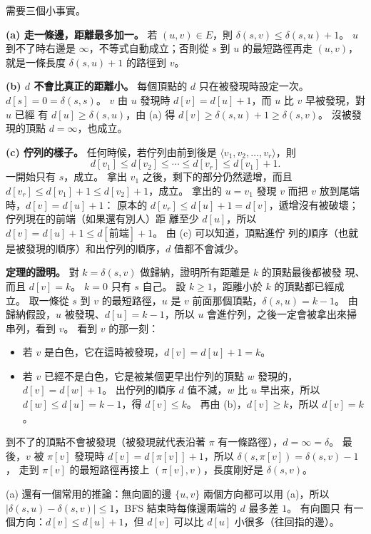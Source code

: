\begin{whybox}
需要三個小事實。

\textbf{(a) 走一條邊，距離最多加一。} 若 $(u, v) \in E$，則 $\delta(s, v) \le \delta(s, u)
+ 1$。 $u$ 到不了時右邊是 $\infty$，不等式自動成立；否則從 $s$ 到 $u$ 的最短路徑再走 $(u, v)$，
就是一條長度 $\delta(s, u) + 1$ 的路徑到 $v$。

\textbf{(b) $d$ 不會比真正的距離小。} 每個頂點的 $d$ 只在被發現時設定一次。 $d[s] = 0
= \delta(s, s)$。 $v$ 由 $u$ 發現時 $d[v] = d[u] + 1$，而 $u$ 比 $v$ 早被發現，對 $u$ 已經
有 $d[u] \ge \delta(s, u)$，由 (a) 得 $d[v] \ge \delta(s, u) + 1 \ge \delta(s, v)$。 沒被發
現的頂點 $d = \infty$，也成立。

\textbf{(c) 佇列的樣子。} 任何時候，若佇列由前到後是 $\langle v_1, v_2, \ldots, v_r
\rangle$，則
\[
d[v_1] \le d[v_2] \le \cdots \le d[v_r] \le d[v_1] + 1.
\]
一開始只有 $s$，成立。 拿出 $v_1$ 之後，剩下的部分仍然遞增，而且 $d[v_r] \le d[v_1] + 1
\le d[v_2] + 1$，成立。 拿出的 $u = v_1$ 發現 $v$ 而把 $v$ 放到尾端時，$d[v] = d[u] + 1$：
原本的 $d[v_r] \le d[u] + 1 = d[v]$，遞增沒有被破壞；佇列現在的前端（如果還有別人）距
離至少 $d[u]$，所以 $d[v] = d[u] + 1 \le d[\text{前端}] + 1$。 由 (c) 可以知道，頂點進佇
列的順序（也就是被發現的順序）和出佇列的順序，$d$ 值都不會減少。

\textbf{定理的證明。} 對 $k = \delta(s, v)$ 做歸納，證明所有距離是 $k$ 的頂點最後都被發
現、而且 $d[v] = k$。 $k = 0$ 只有 $s$ 自己。 設 $k \ge 1$，距離小於 $k$ 的頂點都已經成
立。 取一條從 $s$ 到 $v$ 的最短路徑，$u$ 是 $v$ 前面那個頂點，$\delta(s, u) = k - 1$。 由
歸納假設，$u$ 被發現、$d[u] = k - 1$，所以 $u$ 會進佇列，之後一定會被拿出來掃串列，看到
$v$。 看到 $v$ 的那一刻：
\begin{itemize}
\item 若 $v$ 是白色，它在這時被發現，$d[v] = d[u] + 1 = k$。
\item 若 $v$ 已經不是白色，它是被某個更早出佇列的頂點 $w$ 發現的，$d[v] = d[w] + 1$。
出佇列的順序 $d$ 值不減，$w$ 比 $u$ 早出來，所以 $d[w] \le d[u] = k - 1$，得 $d[v] \le k$。
再由 (b)，$d[v] \ge k$，所以 $d[v] = k$。
\end{itemize}
到不了的頂點不會被發現（被發現就代表沿著 $\pi$ 有一條路徑），$d = \infty = \delta$。 最
後，$v$ 被 $\pi[v]$ 發現時 $d[v] = d[\pi[v]] + 1$，所以 $\delta(s, \pi[v]) = \delta(s, v) - 1$，
走到 $\pi[v]$ 的最短路徑再接上 $(\pi[v], v)$，長度剛好是 $\delta(s, v)$。
\end{whybox}

(a) 還有一個常用的推論：無向圖的邊 $\{u, v\}$ 兩個方向都可以用 (a)，所以
$|\delta(s, u) - \delta(s, v)| \le 1$，BFS 結束時每條邊兩端的 $d$ 最多差 $1$。 有向圖只
有一個方向：$d[v] \le d[u] + 1$，但 $d[v]$ 可以比 $d[u]$ 小很多（往回指的邊）。

